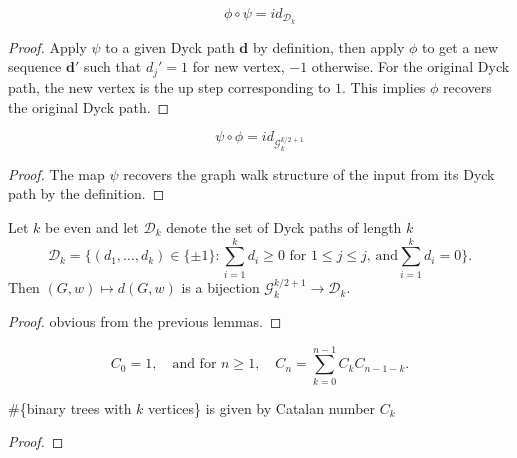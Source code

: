 \begin{lemma}\label{lem:composition1}
  $$\phi \circ \psi = id_{\mathcal{D}_k}$$
  \begin{proof}
    Apply $\psi$ to a given Dyck path $\mathbf{d}$ by definition, then apply $\phi$ to get a new sequence
    $\mathbf{d}'$ such that $d_j' = 1$ for new vertex, $-1$ otherwise. For the original Dyck path, the new
    vertex is the up step corresponding to $1$. This implies $\phi$ recovers the original Dyck path.
  \end{proof}
\end{lemma}


\begin{lemma}\label{lem:composition2}
  $$\psi \circ \phi = id_{\mathcal{G}^{k/2 + 1}_k}$$
   \begin{proof}
    The map $\psi$ recovers the graph walk structure of the input from its Dyck path by the definition.
  \end{proof}
\end{lemma}


\begin{lemma}\label{lem:walk_to_Dyck_paths_bijection}
  Let $k$ be even and let $\mathcal{D}_k$ denote the set of Dyck paths of length $k$
  \[ \mathcal{D}_k = \{(d_1,\ldots,d_k)\in\{\pm 1\}\colon \sum_{i=1}^k d_i\ge 0\text{ for }1\le j\le j\text{, and}\sum_{i=1}^kd_i=0\}. \]
  Then $(G,w)\mapsto {d}(G,w)$ is a bijection $\mathcal{G}_k^{k/2+1}\to\mathcal{D}_k$.
  \begin{proof}
    \uses{}
    obvious from the previous lemmas.
  \end{proof}
\end{lemma}

\begin{definition}\label{def:Catalan_number}
  \[C_0 = 1, \quad \text{and for } n \geq 1, \quad C_n = \sum_{k=0}^{n-1} C_k C_{n-1-k}.\]
\end{definition}


\begin{lemma}\label{lem:binary_tree_Catalan_number}
  \#\{binary trees with $k$ vertices\} is given by Catalan number $C_k$
  \begin{proof}
  \end{proof}
\end{lemma}


